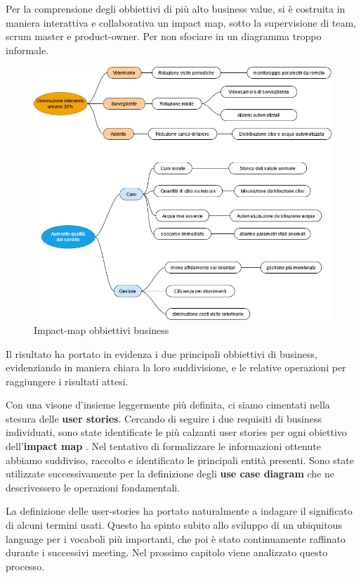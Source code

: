 	Per la comprensione degli obbiettivi di più alto business value, si è costruita in maniera interattiva e collaborativa un impact map, sotto la supervisione di team, scrum master e product-owner. Per non sfociare in un diagramma troppo informale.
    \begin{figure}[ht]
        \caption{Impact-map obbiettivi business}
        \centering
        \includegraphics[width=1\textwidth]{DrawIo/impactMap.png}
    \end{figure}

    Il risultato ha portato in evidenza i due principali obbiettivi di business, evidenziando in maniera chiara la loro suddivisione, e le relative operazioni per raggiungere i risultati attesi.
    
    Con una visone d'insieme leggermente più definita, ci siamo cimentati nella stesura delle \textbf{user stories}. Cercando di seguire i due requisiti di business individuati, sono state identificate le più calzanti user stories per ogni obiettivo  dell'\textbf{impact map}
    .
    Nel tentativo di formalizzare le informazioni ottenute abbiamo suddiviso, raccolto e identificato le principali entità presenti. Sono state utilizzate successivamente per la definizione degli \textbf{use case diagram} che ne descrivessero le operazioni fondamentali.

	La definizione delle user-stories ha portato naturalmente a indagare il significato di alcuni termini usati. Questo ha spinto subito allo sviluppo di un ubiquitous language per i vocaboli più importanti, che poi è stato continuamente raffinato durante i successivi meeting. 
	Nel prossimo capitolo viene analizzato questo processo. 
    
